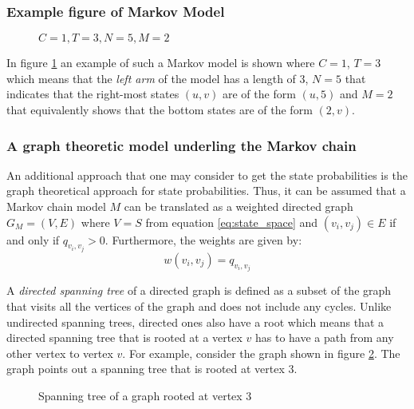 \subsubsection{Example figure of Markov Model}

\begin{figure}[h]
    \centering
    \scalebox{0.7}{
        
        }
    \caption{\(C=1, T=3, N=5, M=2\)}
    \label{fig:Markov_1352_example_for_closed_form}
\end{figure}

In figure \ref{fig:Markov_1352_example_for_closed_form} an example of such a 
Markov model is shown where \(C=1\), \(T=3\) which means that the \textit{left 
arm} 
of the model has a length of \(3\), \(N=5\) that indicates that the right-most 
states \((u,v)\) are of the form \((u,5)\) and \(M=2\) that equivalently shows 
that the bottom states are of the form \((2,v)\).

\subsubsection{A graph theoretic model underling the Markov chain}

An additional approach that one may consider to get the state probabilities is 
the graph theoretical approach for state probabilities.
Thus, it can be assumed that a Markov chain model \(M\) can be translated as a 
weighted directed graph \(G_M = (V, E)\) where \(V=S\) from equation 
\ref{eq:state_space} and \((v_i, v_j)\in E\) if and only if \(q_{v_i, v_j}>0\). 
Furthermore, the weights are given by:
\[
    w(v_i, v_j) = q_{v_i, v_j}
\]

A \textit{directed spanning tree} of a directed graph is defined as a subset of 
the graph that visits all the vertices of the graph and does not include any cycles. 
Unlike undirected spanning trees, directed ones also have a root which means 
that a directed spanning tree that is rooted at a vertex \(v\) has to have a 
path from any other vertex to vertex \(v\). 
For example, consider the graph shown in figure \ref{fig:example_spanning_tree}.
The graph points out a spanning tree that is rooted at vertex 3.


\begin{figure}[h]
    \centering
    \caption{Spanning tree of a graph rooted at vertex 3}
    \label{fig:example_spanning_tree}
\end{figure}

